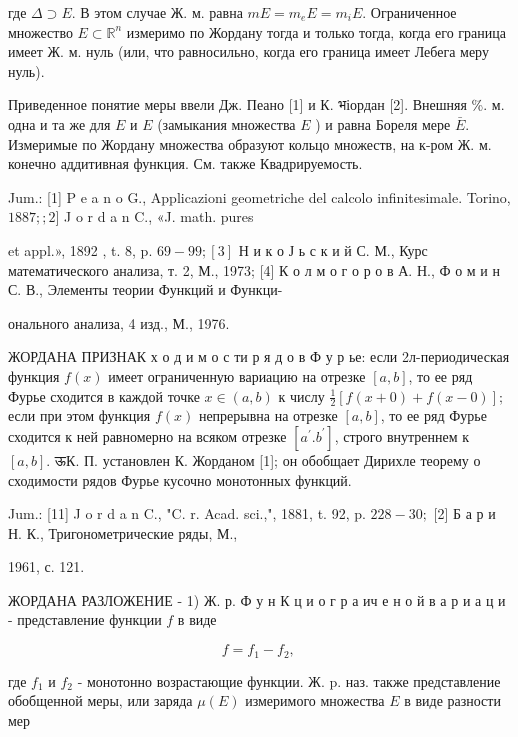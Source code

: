 \documentclass[10pt]{article}
\begin{document}
где $\Delta \supset E$. В этом случае Ж. м. равна $m E=m_{e} E=m_{i} E$. Ограниченное множество $E \subset \mathbb{R}^{n}$ измеримо по Жордану тогда и только тогда, когда его граница имеет Ж. м. нуль (или, что равносильно, когда его граница имеет Лебега меру нуль).



Приведенное понятие меры ввели Дж. Пеано [1] и К. भіордан [2]. Внешняя \%. м. одна и та же для $E$ и $E$ (замыкания множества $E$ ) и равна Бореля мере $\bar{E}$. Измеримые по Жордану множества образуют кольцо множеств, на к-ром Ж. м. конечно аддитивная функция. См. также Квадрируемость.



Jum.: [1] P e a n o G., Applicazioni geometriche del calcolo infinitesimale. Torino, $1887 ; ; 2]$ J o r d a n C., «J. math. pures

et appl.», 1892 , t. 8, p. $69-99 ;[3]$ Н и к о Ј ь с к и й С. М., Курс математического анализа, т. 2, М., 1973; [4] К о л м о г о р о в А. Н., Ф о м и н С. В., Элементы теории Функций и Функци-

онального анализа, 4 изд., М., 1976.



ЖОРДАНА ПРИЗНАК $\mathbf{х}$ о д и м о с ти р я д о в Ф у р ье: если 2л-периодическая функция $f(x)$ имеет ограниченную вариацию на отрезке $[a, b]$, то ее ряд Фурье сходится в каждой точке $x \in(a, b)$ к числу $\frac{1}{2}[f(x+0)+f(x-0)] ;$ если при этом функция $f(x)$ непрерывна на отрезке $[a, b]$, то ее ряд Фурье сходится к ней равномерно на всяком отрезке $\left[a^{\prime} . b^{\prime}\right]$, строго внутреннем к $[a, b]$. ऊК. П. установлен К. Жорданом [1]; он обобщает Дирихле теорему о сходимости рядов Фурье кусочно монотонных функций.



Jum.: [11] J o r d a n C., "C. r. Acad. sci.,", 1881, t. 92, p. $228-30 ;$ [2] Б а р и Н. К., Тригонометрические ряды, М.,

1961, с. 121.



ЖОРДАНА РАЗЛОЖЕНИЕ - 1) Ж. р. Ф у н К ц и о г р а ич е н о й в а р и а ц и - представление функции $f$ в виде



\[

f=f_{1}-f_{2} \text {, }

\]



где $f_{1}$ и $f_{2}$ - монотонно возрастающие функции. Ж. p. наз. также представление обобщенной меры, или заряда $\mu(E)$ измеримого множества $E$ в виде разности мер
\end{document}
